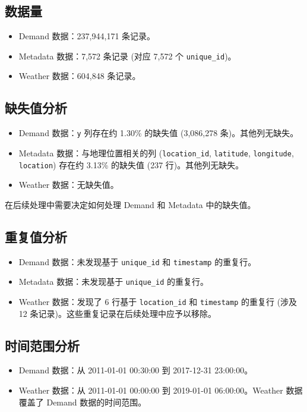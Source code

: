 \documentclass{article} %
\begin{document}
\subsection{数据量}
\label{subsec:data_volume}
\begin{itemize}
    \item Demand 数据：237,944,171 条记录。
    \item Metadata 数据：7,572 条记录 (对应 7,572 个 \texttt{unique\_id})。
    \item Weather 数据：604,848 条记录。
\end{itemize}

\subsection{缺失值分析}
\label{subsec:missing_values}
\begin{itemize}
    \item Demand 数据：\texttt{y} 列存在约 1.30\% 的缺失值 (3,086,278 条)。其他列无缺失。
    \item Metadata 数据：与地理位置相关的列 (\texttt{location\_id}, \texttt{latitude}, \texttt{longitude}, \texttt{location}) 存在约 3.13\% 的缺失值 (237 行)。其他列无缺失。
    \item Weather 数据：无缺失值。
\end{itemize}
在后续处理中需要决定如何处理 Demand 和 Metadata 中的缺失值。

\subsection{重复值分析}
\label{subsec:duplicate_values}
\begin{itemize}
    \item Demand 数据：未发现基于 \texttt{unique\_id} 和 \texttt{timestamp} 的重复行。
    \item Metadata 数据：未发现基于 \texttt{unique\_id} 的重复行。
    \item Weather 数据：发现了 6 行基于 \texttt{location\_id} 和 \texttt{timestamp} 的重复行 (涉及 12 条记录)。这些重复记录在后续处理中应予以移除。
\end{itemize}

\subsection{时间范围分析}
\label{subsec:time_range}
\begin{itemize}
    \item Demand 数据：从 2011-01-01 00:30:00 到 2017-12-31 23:00:00。
    \item Weather 数据：从 2011-01-01 00:00:00 到 2019-01-01 06:00:00。Weather 数据覆盖了 Demand 数据的时间范围。
\end{itemize}
\end{document}
